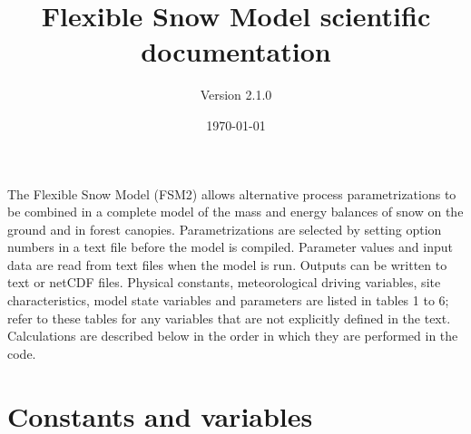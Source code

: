 \documentclass[fleqn]{article}
\title{Flexible Snow Model scientific documentation}
\author{Version 2.1.0}
\date{\today}
\begin{document}
\maketitle

{\parindent 0pt
The Flexible Snow Model (FSM2) allows alternative process parametrizations to be combined in a complete model of the mass and energy balances of snow on the ground and in forest canopies. Parametrizations are selected by setting option numbers in a text file before the model is compiled. Parameter values and input data are read from text files when the model is run. Outputs can be written to text or netCDF files. Physical constants, meteorological driving variables, site characteristics, model state variables and parameters are listed in tables 1 to 6; refer to these tables for any variables that are not explicitly defined in the text. Calculations are described below in the order in which they are performed in the code.
}

\section{Constants and variables}
\end{document}
